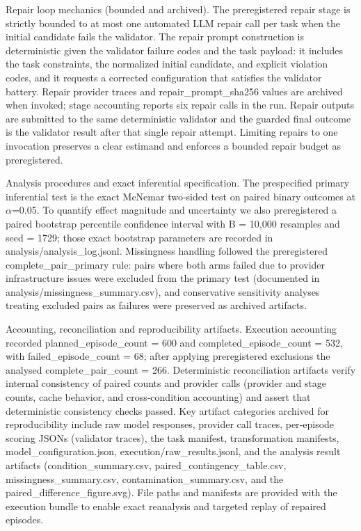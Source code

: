 \documentclass[conference]{IEEEtran}
\begin{document}
Repair loop mechanics (bounded and archived).  The preregistered repair stage is strictly bounded to at most one automated LLM repair call per task when the initial candidate fails the validator. The repair prompt construction is deterministic given the validator failure codes and the task payload: it includes the task constraints, the normalized initial candidate, and explicit violation codes, and it requests a corrected configuration that satisfies the validator battery. Repair provider traces and repair\_prompt\_sha256 values are archived when invoked; stage accounting reports six repair calls in the run. Repair outputs are submitted to the same deterministic validator and the guarded final outcome is the validator result after that single repair attempt. Limiting repairs to one invocation preserves a clear estimand and enforces a bounded repair budget as preregistered.

Analysis procedures and exact inferential specification.  The prespecified primary inferential test is the exact McNemar two‑sided test on paired binary outcomes at \ensuremath{\alpha}=0.05. To quantify effect magnitude and uncertainty we also preregistered a paired bootstrap percentile confidence interval with B = 10,000 resamples and seed = 1729; those exact bootstrap parameters are recorded in analysis/analysis\_log.jsonl. Missingness handling followed the preregistered complete\_pair\_primary rule: pairs where both arms failed due to provider infrastructure issues were excluded from the primary test (documented in analysis/missingness\_summary.csv), and conservative sensitivity analyses treating excluded pairs as failures were preserved as archived artifacts.

Accounting, reconciliation and reproducibility artifacts.  Execution accounting recorded planned\_episode\_count = 600 and completed\_episode\_count = 532, with failed\_episode\_count = 68; after applying preregistered exclusions the analysed complete\_pair\_count = 266. Deterministic reconciliation artifacts verify internal consistency of paired counts and provider calls (provider and stage counts, cache behavior, and cross‑condition accounting) and assert that deterministic consistency checks passed. Key artifact categories archived for reproducibility include raw model responses, provider call traces, per‑episode scoring JSONs (validator traces), the task manifest, transformation manifests, model\_configuration.json, execution/raw\_results.jsonl, and the analysis result artifacts (condition\_summary.csv, paired\_contingency\_table.csv, missingness\_summary.csv, contamination\_summary.csv, and the paired\_difference\_figure.svg). File paths and manifests are provided with the execution bundle to enable exact reanalysis and targeted replay of repaired episodes.
\end{document}
